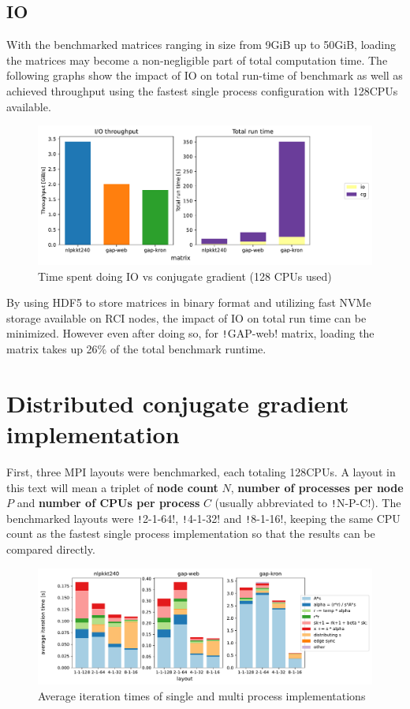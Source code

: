 \documentclass[thesis=M,english]{FITthesis}[2019/12/23]
\newcommand{\csre}[1]{\texttt!#1!}
\begin{document}
\subsection{IO}

With the benchmarked matrices ranging in size from 9GiB up to 50GiB, loading the matrices
may become a non-negligible part of total computation time. The following graphs show the impact of
IO on total run-time of benchmark as well as achieved throughput using the fastest single process
configuration with 128CPUs available.

\begin{figure}[htp]
    \centering
    \includegraphics[scale=0.6]{static/io_sp.pdf}
    \caption{Time spent doing IO vs conjugate gradient (128 CPUs used)}
\end{figure}

By using HDF5 to store matrices in binary format and utilizing fast NVMe storage available
on RCI nodes, the impact of IO on total run time can be minimized. However even after doing so,
for \csre{GAP-web} matrix, loading the matrix takes up 26\% of the total benchmark runtime.


\section{Distributed conjugate gradient implementation}

First, three MPI layouts were benchmarked, each totaling 128CPUs. A layout
in this text will mean a triplet of \textbf{node count} $N$,
\textbf{number of processes per node} $P$
and \textbf{number of CPUs per process} $C$ (usually abbreviated to \csre{N-P-C}).
The benchmarked layouts were \csre{2-1-64}, \csre{4-1-32} and \csre{8-1-16}, keeping
the same CPU count as the fastest single process implementation so that the results
can be compared directly.

\begin{figure}[htp]
    \centering
    \includegraphics[scale=0.45]{static/mpi.pdf}
    \caption{Average iteration times of single and multi process implementations}
\end{figure}
\end{document}
